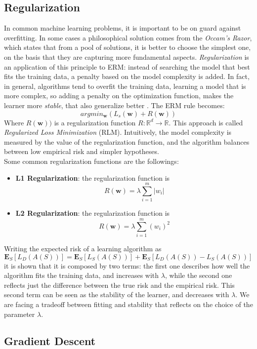 \subsection{Regularization}
In common machine learning problems, it is important to be on guard against overfitting. In some cases a philosophical solution comes from the \textit{Occam's Razor}, which states that from a pool of solutions, it is better to choose the simplest one, on the basis that they are capturing more fundamental aspects. \textit{Regularization} is an application of this principle to ERM: instead of searching the model that best fits the training data, a penalty based on the model complexity is added. In fact, in general, algorithms tend to overfit the training data, learning a model that is more complex, so adding a penalty on the optimization function, makes the learner more \textit{stable}, that also generalize better \cite{stability_generalization}.
The ERM rule becomes:
\[argmin_\mathbf{w} (L_s(\mathbf{w}) + R(\mathbf{w}))\]
Where $R(\mathbf{w}))$ is a regularization function $R: \mathbb{R}^d \rightarrow \mathbb{R} $. This approach is called \textit{Regularized Loss Minimization} (RLM). Intuitively, the model complexity is measured by the value of the regularization function, and the algorithm balances between low empirical risk and simpler hypotheses.\\
Some common regularization functions are the followings:
\begin{itemize}
	\item \textbf{L1 Regularization}: the regularization function is
	\[ R(\textbf{w}) = \lambda \sum_{i=1}^{m} |w_i| \]
	\item \textbf{L2 Regularization}: the regularization function is
	\[ R(\textbf{w}) = \lambda \sum_{i=1}^{m} (w_i)^2 \]
\end{itemize}

Writing the expected risk of a learning algorithm as
\[ \mathbf{E}_S[L_D(A(S))] = \mathbf{E}_S[L_S(A(S))] + \mathbf{E}_S[L_D(A(S)) - L_S(A(S))] \]
it is shown that it is composed by two terms: the first one describes how well the algorithm fits the training data, and increases with $\lambda$, while the second one reflects just the difference between the true risk and the empirical risk. This second term can be seen as the stability of the learner, and decreases with $\lambda$. We are facing a tradeoff between fitting and stability that reflects on the choice of the parameter $\lambda$.



\subsection{Gradient Descent}

